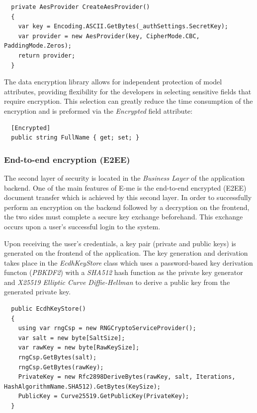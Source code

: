 \begin{lstlisting}
  private AesProvider CreateAesProvider()
  {
	var key = Encoding.ASCII.GetBytes(_authSettings.SecretKey);
	var provider = new AesProvider(key, CipherMode.CBC,	 PaddingMode.Zeros);
	return provider;
  }
\end{lstlisting}

The data encryption library allows for independent protection of model attributes, providing flexibility for the developers in selecting sensitive fields
that require encryption. This selection can greatly reduce the time consumption of the encryption and is preformed via the \emph{Encrypted} field attribute:

\begin{lstlisting}
  [Encrypted]
  public string FullName { get; set; }
\end{lstlisting}

\subsubsection{End-to-end encryption (E2EE)}

The second layer of security is located in the \emph{Business Layer} of the application backend.
One of the main features of E-me is the end-to-end encrypted (E2EE) document transfer which is achieved by this second layer.
In order to successfully perform an encryption on the backend followed by a decryption on the frontend, the two sides must complete a secure key exchange beforehand.
This exchange occurs upon a user's successful login to the system.

Upon receiving the user's credentials, a key pair (private and public keys) is generated on the frontend of the application.
The key generation and derivation takes place in the \emph{EcdhKeyStore} class which uses a password-based key derivation functon (\emph{PBKDF2}) with a \emph{SHA512} hash function
as the private key generator and \emph{X25519 Elliptic Curve Diffie-Hellman} to derive a public key from the generated private key.

\begin{lstlisting}
  public EcdhKeyStore()
  {
	using var rngCsp = new RNGCryptoServiceProvider();
	var salt = new byte[SaltSize];
	var rawKey = new byte[RawKeySize];
	rngCsp.GetBytes(salt);
	rngCsp.GetBytes(rawKey);
	PrivateKey = new Rfc2898DeriveBytes(rawKey, salt, Iterations, HashAlgorithmName.SHA512).GetBytes(KeySize);
	PublicKey = Curve25519.GetPublicKey(PrivateKey);  
  }
\end{lstlisting}

